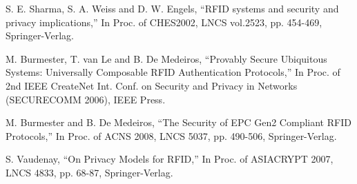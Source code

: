 \documentclass[english]{llncs}
\begin{document}
\begin{thebibliography}{21}
 S. E. Sharma, S. A. Weiss and D. W. Engels, {}``RFID
systems and security and privacy implications,'' In Proc. of CHES2002,
LNCS vol.2523, pp. 454-469, Springer-Verlag.

 M. Burmester, T. van Le and B. De Medeiros, {}``Provably
Secure Ubiquitous Systems: Universally Composable RFID Authentication
Protocols,'' In Proc. of 2nd IEEE CreateNet Int. Conf. on Security
and Privacy in Networks (SECURECOMM 2006), IEEE Press.

 M. Burmester and B. De Medeiros, {}``The Security
of EPC Gen2 Compliant RFID Protocols,'' In Proc. of ACNS 2008, LNCS
5037, pp. 490-506, Springer-Verlag.

 S. Vaudenay, {}``On Privacy Models for RFID,'' In
Proc. of ASIACRYPT 2007, LNCS 4833, pp. 68-87, Springer-Verlag.
\end{thebibliography}
\end{document}
